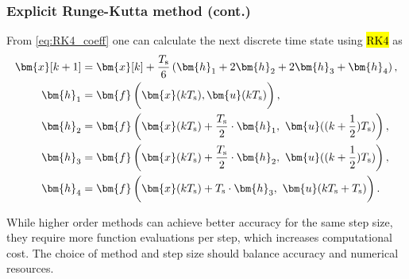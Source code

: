 \begin{frame}
    \frametitle{Explicit Runge-Kutta method (cont.)}
    From \eqref{eq:RK4_coeff} one can calculate the next discrete time state using \hl{RK4} as
    \begin{equation}
        \begin{split}
            \bm{x}[k+1] & = \bm{x}[k] + \frac{T_\mathrm{s}}{6}\left(\bm{h}_1 + 2\bm{h}_2 + 2\bm{h}_3 + \bm{h}_4\right),                                                    \\
            \bm{h}_1    & = \bm{f}\left(\vphantom{\frac{T_\mathrm{s}}{2}}\bm{x}(kT_\mathrm{s}),\bm{u}(kT_\mathrm{s})\right),                                               \\
            \bm{h}_2    & = \bm{f}\left(\bm{x}(kT_\mathrm{s}) + \frac{T_\mathrm{s}}{2}\cdot\bm{h}_1, \,\,\bm{u}((k+\frac{1}{2})T_\mathrm{s})\right),                       \\
            \bm{h}_3    & = \bm{f}\left(\bm{x}(kT_\mathrm{s}) + \frac{T_\mathrm{s}}{2}\cdot\bm{h}_2, \,\,\bm{u}((k+\frac{1}{2})T_\mathrm{s})\right),                       \\
            \bm{h}_4    & = \bm{f}\left(\vphantom{\frac{T_\mathrm{s}}{2}}\bm{x}(kT_\mathrm{s}) + T_\mathrm{s}\cdot\bm{h}_3, \,\,\bm{u}(kT_\mathrm{s}+T_\mathrm{s})\right).
        \end{split}
        \label{eq:RK4_calculation_law}
    \end{equation}
    \vspace{-0.2cm}\pause%
    \begin{varblock}{}
        While higher order methods can achieve better accuracy for the same step size, they require more function evaluations per step, which increases computational cost. The choice of method and step size should balance accuracy and numerical resources.
    \end{varblock}
\end{frame}

